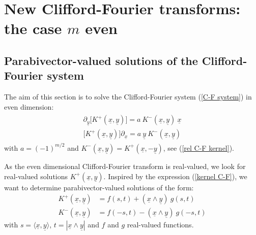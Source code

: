 \documentclass{amsart}
\theoremstyle{remark}
\begin{document}
\section{New Clifford-Fourier transforms: the case $m$ even}
\setcounter{equation}{0}
\label{Even}

\subsection{Parabivector-valued solutions of the Clifford-Fourier system}
The aim of this section is to solve the Clifford-Fourier system (\ref{C-F system}) in even dimension:
\begin{align}\label{system}
\begin{split}
\partial_{\underline{y}} \lbrack K^+({\underline{x}},{\underline{y}}) \rbrack  =  a \ K^-({\underline{x}},{\underline{y}}) \ {\underline{x}}\\
\lbrack K^+({\underline{x}},{\underline{y}}) \rbrack \partial_{\underline{x}}  =  a \ {\underline{y}} \ K^-({\underline{x}},{\underline{y}})
\end{split}
\end{align}
with $ a=(-1)^{m/2}$ and $K^-({\underline{x}},{\underline{y}}) = K^+({\underline{x}},-{\underline{y}})$, see (\ref{rel C-F kernel}). 

As the even dimensional Clifford-Fourier transform is real-valued, we look for real-valued solutions $K^+({\underline{x}},{\underline{y}})$. Inspired by the expression (\ref{kernel C-F}), we want to determine parabivector-valued solutions of the form:
\begin{align*}
K^+({\underline{x}},{\underline{y}}) &= f(s,t) + ({\underline{x}} \wedge {\underline{y}}) \ g(s,t)\\
K^-({\underline{x}},{\underline{y}}) &=  f(-s,t) - ({\underline{x}} \wedge {\underline{y}}) \ g(-s,t)
\end{align*}
with $s = \langle {\underline{x}},{\underline{y}} \rangle$, $t=|{\underline{x}} \wedge {\underline{y}}|$ and $f$ and $g$ real-valued functions.
\end{document}
